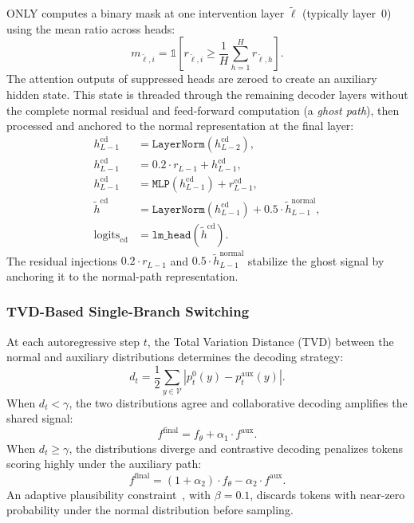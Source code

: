 ONLY computes a binary mask at one intervention layer $\tilde{\ell}$ (typically layer~0) using the mean ratio across heads:
\begin{equation}
m_{\tilde{\ell},i} = \mathbb{1}\!\left[ r_{\tilde{\ell},i} \geq \frac{1}{H}\sum_{h=1}^{H} r_{\tilde{\ell},h} \right].
\end{equation}
The attention outputs of suppressed heads are zeroed to create an auxiliary hidden state. This state is threaded through the remaining decoder layers without the complete normal residual and feed-forward computation (a \emph{ghost path}), then processed and anchored to the normal representation at the final layer:
\begin{align}
h^{\mathrm{cd}}_{L-1} &= \texttt{LayerNorm}(h^{\mathrm{cd}}_{L-2}), \\
h^{\mathrm{cd}}_{L-1} &= 0.2 \cdot r_{L-1} + h^{\mathrm{cd}}_{L-1}, \\
h^{\mathrm{cd}}_{L-1} &= \texttt{MLP}(h^{\mathrm{cd}}_{L-1}) + r^{\mathrm{cd}}_{L-1}, \\
\tilde{h}^{\mathrm{cd}} &= \texttt{LayerNorm}(h^{\mathrm{cd}}_{L-1}) + 0.5 \cdot \tilde{h}^{\mathrm{normal}}_{L-1}, \\
\mathrm{logits}_{\mathrm{cd}} &= \texttt{lm\_head}(\tilde{h}^{\mathrm{cd}}).
\end{align}
The residual injections $0.2 \cdot r_{L-1}$ and $0.5 \cdot \tilde{h}^{\mathrm{normal}}_{L-1}$ stabilize the ghost signal by anchoring it to the normal-path representation.

\subsubsection{TVD-Based Single-Branch Switching}

At each autoregressive step $t$, the Total Variation Distance (TVD) between the normal and auxiliary distributions determines the decoding strategy:
\begin{equation}
d_t = \frac{1}{2}\sum_{y \in \mathcal{V}} \left|p_t^{0}(y) - p_t^{\mathrm{aux}}(y)\right|.
\end{equation}
When $d_t < \gamma$, the two distributions agree and collaborative decoding amplifies the shared signal:
\begin{equation}
f^{\mathrm{final}} = f_{\theta} + \alpha_1 \cdot f^{\mathrm{aux}}.
\end{equation}
When $d_t \geq \gamma$, the distributions diverge and contrastive decoding penalizes tokens scoring highly under the auxiliary path:
\begin{equation}
f^{\mathrm{final}} = (1 + \alpha_2) \cdot f_{\theta} - \alpha_2 \cdot f^{\mathrm{aux}}.
\end{equation}
An adaptive plausibility constraint~\cite{li2023contrastive}, with $\beta = 0.1$, discards tokens with near-zero probability under the normal distribution before sampling.


